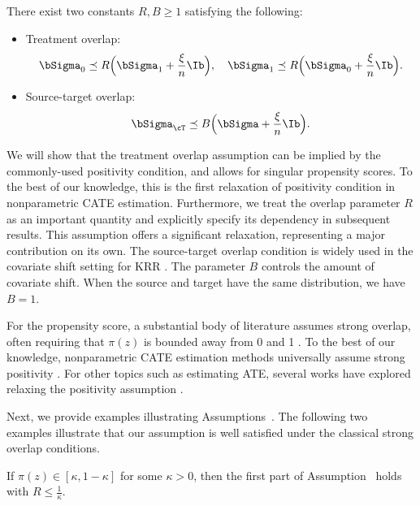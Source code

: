 \documentclass[12pt,a4paper,pdftex,onepage]{article}
\newcommand{\Sigmatreated}{\bSigma_{1}}
\newcommand{\Sigmacontrol}{\bSigma_{0}}
\begin{document}
\begin{assumption}\label{assumption; weak treatment overlap}\label{assumption; overlap source target}  
There exist two constants \(R,B \geq 1\) satisfying the following:
\begin{itemize}
\item Treatment overlap:
\[
\Sigmacontrol  \preceq R\Bigl(\Sigmatreated + \frac{\xi}{n} \Ib\Bigr),
\quad
\Sigmatreated \preceq R\Bigl(\Sigmacontrol + \frac{\xi}{n} \Ib\Bigr).
\]
\item Source-target overlap:
\[
\bSigma_{\cT} \preceq B \Bigl(\bSigma + \frac{\xi}{n} \Ib\Bigr).
\]
\end{itemize}
\end{assumption}

We will show that the treatment overlap assumption can be implied by the commonly-used positivity condition, and allows for singular propensity scores. To the best of our knowledge, this is the first relaxation of positivity condition in nonparametric CATE estimation. 
Furthermore, we treat the overlap parameter \(R\) as an important quantity and explicitly specify its dependency in subsequent results. 
This assumption offers a significant relaxation, representing a major contribution on its own.
The source-target overlap condition is widely used in the covariate shift setting for KRR \citep{ma2023optimally,wang2023pseudo}. The parameter \(B\) controls the amount of covariate shift. When the source and target have the same distribution, we have $B = 1$.


\begin{remark}
For the propensity score, a substantial body of literature assumes strong overlap, often requiring that \(\pi(z)\) is bounded away from 0 and 1 \citep{wager2024causal}. 
To the best of our knowledge, nonparametric CATE estimation methods universally assume strong positivity \citep{kennedy2020towards,kennedy2022minimax,curth2021nonparametric,gao2020minimax}. 
For other topics such as estimating ATE, several works have explored relaxing the positivity assumption \citep{mou2023kernel,ma2022testing,ma2020robust}.
\end{remark}

Next, we provide examples illustrating Assumptions~.
The following two examples illustrate that our assumption is well satisfied under the classical strong overlap conditions.


\begin{example}\label{example; positivity}
If \(\pi(z) \in [\kappa,1-\kappa]\) for some \(\kappa>0\), then the first part of Assumption~ holds with \(R \leq \frac{1}{\kappa}\). 
\end{example}
\end{document}
